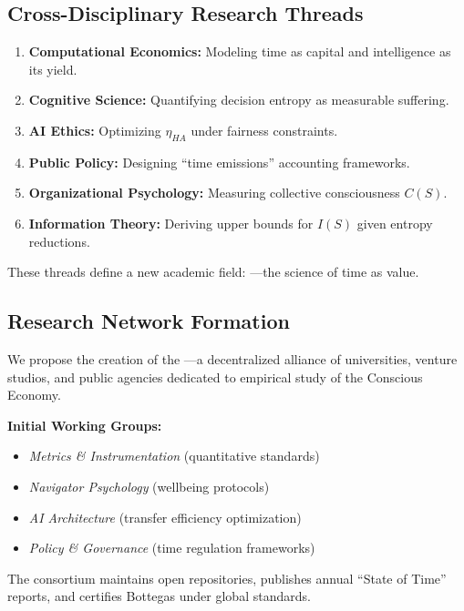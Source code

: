 \subsection{Cross-Disciplinary Research Threads}
\label{sec:research-threads}

\begin{enumerate}
    \item \textbf{Computational Economics:} Modeling time as capital and intelligence as its yield.
    \item \textbf{Cognitive Science:} Quantifying decision entropy as measurable suffering.
    \item \textbf{AI Ethics:} Optimizing $\eta_{HA}$ under fairness constraints.
    \item \textbf{Public Policy:} Designing ``time emissions'' accounting frameworks.
    \item \textbf{Organizational Psychology:} Measuring collective consciousness $C(S)$.
    \item \textbf{Information Theory:} Deriving upper bounds for $I(S)$ given entropy reductions.
\end{enumerate}

These threads define a new academic field: —the science of time as value.

\subsection{Research Network Formation}
\label{sec:research-network}

We propose the creation of the —a decentralized alliance of universities, venture studios, and public agencies dedicated to empirical study of the Conscious Economy.

\textbf{Initial Working Groups:}
\begin{itemize}
    \item \textit{Metrics \& Instrumentation} (quantitative standards)
    \item \textit{Navigator Psychology} (wellbeing protocols)
    \item \textit{AI Architecture} (transfer efficiency optimization)
    \item \textit{Policy \& Governance} (time regulation frameworks)
\end{itemize}

The consortium maintains open repositories, publishes annual ``State of Time'' reports, and certifies Bottegas under global standards.

